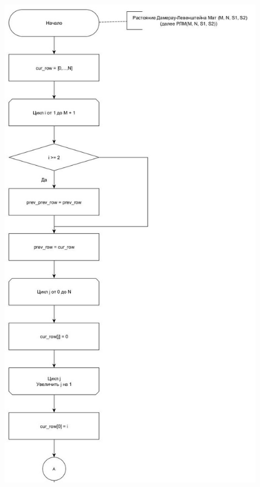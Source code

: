 \documentclass[12pt]{report}
\begin{document}
\begin{figure}[h]
	\centering
	\includegraphics[scale=0.7]{damer-lev_matr_11.jpg}

	\label{fig:mpr}
\end{figure}
\clearpage
\end{document}
